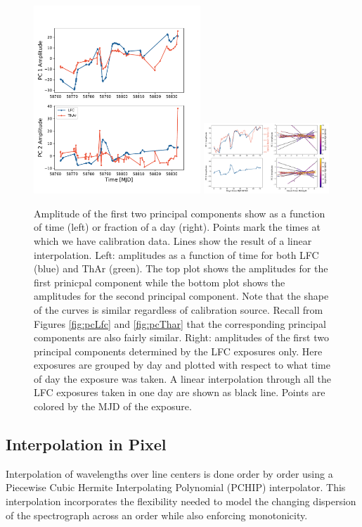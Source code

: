 \documentclass[12pt, letterpaper]{article}
\begin{document}
\begin{figure}[h!]
\centering
\includegraphics[width=0.56\textwidth]{Figures/pcAs.pdf}
\includegraphics[width=0.42\textwidth]{Figures/pcAs_byDay.pdf}
\caption{Amplitude of the first two principal components show as a function of time (left) or fraction of a day (right).  Points mark the times at which we have calibration data.  Lines show the result of a linear interpolation.  Left: amplitudes as a function of time for both LFC (blue) and ThAr (green).  The top plot shows the amplitudes for the first prinicpal component while the bottom plot shows the amplitudes for the second principal component.  Note that the shape of the curves is similar regardless of calibration source.  Recall from Figures \ref{fig:pcLfc} and \ref{fig:pcThar} that the corresponding principal components are also fairly similar.
Right: amplitudes of the first two principal components determined by the LFC exposures only.  Here exposures are grouped by day and plotted with respect to what time of day the exposure was taken.  A linear interpolation through all the LFC exposures taken in one day are shown as black line.  Points are colored by the MJD of the exposure.}
\label{fig:nightlyVariation}
\end{figure} 

\subsection{Interpolation in Pixel}
Interpolation of wavelengths over line centers is done order by order using a Piecewise Cubic Hermite Interpolating Polynomial (PCHIP) interpolator.  This interpolation incorporates the flexibility needed to model the changing dispersion of the spectrograph across an order while also enforcing monotonicity.
\end{document}
